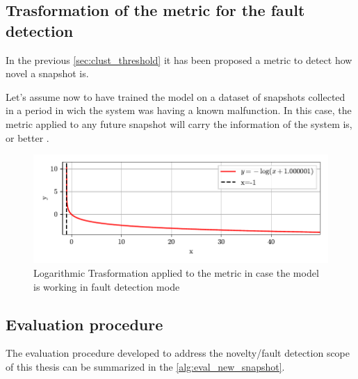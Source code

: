 \subsection{Trasformation of the metric for the fault detection}
\label{sec:clust_fault}
In the previous \autoref{sec:clust_threshold} it has been proposed a metric to detect how novel a snapshot is.

Let's assume now to have trained the model on a dataset of snapshots collected in a period in wich the system was having a known malfunction. In this case, the metric applied to any future snapshot will carry the information of  the system is, or better .

\begin{figure}[htbp]
  \centering
  \includegraphics[width=\textwidth]{images/metric_trasform.pdf}
  \caption{Logarithmic Trasformation applied to the metric in case the model is working in fault detection mode}
  \label{fig:kmeans_fault}
\end{figure}


\subsection{Evaluation procedure}
The evaluation procedure developed to address the novelty/fault detection scope of this thesis can be summarized in the \autoref{alg:eval_new_snapshot}.


